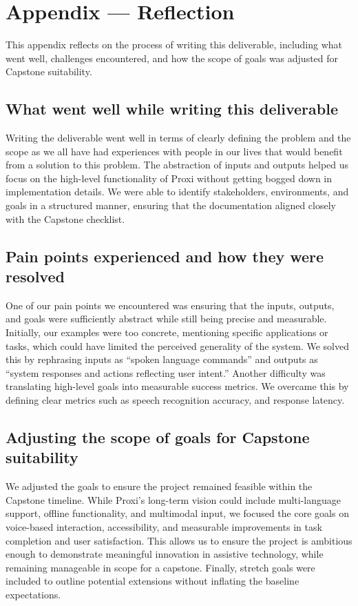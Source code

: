 \documentclass{article}
\begin{document}
\newpage{}

\section*{Appendix --- Reflection}

This appendix reflects on the process of writing this deliverable, including what went well, challenges encountered, and how the scope of goals was adjusted for Capstone suitability.

\subsection*{What went well while writing this deliverable}
Writing the deliverable went well in terms of clearly defining the problem and the scope as we all have had experiences with people in our lives that would benefit from a solution to this problem. The abstraction of inputs and outputs helped us focus on the high-level functionality of Proxi without getting bogged down in implementation details. We were able to identify stakeholders, environments, and goals in a structured manner, ensuring that the documentation aligned closely with the Capstone checklist.  

\subsection*{Pain points experienced and how they were resolved}
One of our pain points we encountered was ensuring that the inputs, outputs, and goals were sufficiently abstract while still being precise and measurable. Initially, our examples were too concrete, mentioning specific applications or tasks, which could have limited the perceived generality of the system. We solved this by rephrasing inputs as “spoken language commands” and outputs as “system responses and actions reflecting user intent.” Another difficulty was translating high-level goals into measurable success metrics. We overcame this by defining clear metrics such as speech recognition accuracy, and response latency. 

\subsection*{Adjusting the scope of goals for Capstone suitability}
We adjusted the goals to ensure the project remained feasible within the Capstone timeline. While Proxi’s long-term vision could include multi-language support, offline functionality, and multimodal input, we focused the core goals on voice-based interaction, accessibility, and measurable improvements in task completion and user satisfaction. This allows us to ensure the project is ambitious enough to demonstrate meaningful innovation in assistive technology, while remaining manageable in scope for a capstone. Finally, stretch goals were included to outline potential extensions without inflating the baseline expectations. 
\end{document}
